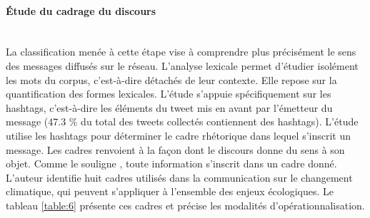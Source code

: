     \paragraph{Étude du cadrage du discours} \ \\

        La classification menée à cette étape vise à comprendre plus précisément le sens des messages diffusés sur le réseau. L’analyse lexicale permet d’étudier isolément les mots du corpus, c'est-à-dire détachés de leur contexte. Elle repose sur la quantification des formes lexicales. L’étude s’appuie spécifiquement sur les hashtags, c'est-à-dire les éléments du tweet mis en avant par l’émetteur du message (47.3 \% du total des tweets collectés contiennent des hashtags). L’étude utilise les hashtags pour déterminer le cadre rhétorique dans lequel s’inscrit un message. Les cadres renvoient à la façon dont le discours donne du sens à son objet. Comme le souligne \textcite{nisbet2009communicating}, toute information s’inscrit dans un cadre donné. L'auteur identifie huit cadres utilisés dans la communication sur le changement climatique, qui peuvent s’appliquer à l’ensemble des enjeux écologiques. Le  tableau \ref{table:6} présente ces cadres et précise les modalités d’opérationnalisation.



